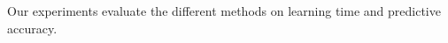 \documentclass{article}
\begin{document}
%
%
%
Our experiments evaluate the different methods on learning time and predictive accuracy.
\end{document}
